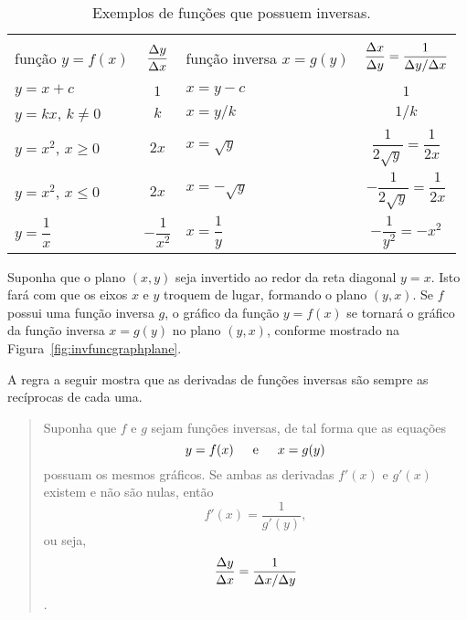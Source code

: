 \begin{table}
\caption{Exemplos de funções que possuem inversas.}
\def\SPC{\hspace{1em}}
\def\ISPC{\hspace{-1em}}
\label{tab:noinvfuncexamples}
\begin{tabular}{@{\SPC}l@{\SPC}|@{\SPC}c@{\SPC}|@{\SPC}l@{\SPC}|@{\SPC}c@{\SPC}}
 \hline
 & & & \\[-1em]
 \multirow{2}{*}{função $y = f(x)$} &
   \multirow{2}{*}{$\dfrac{\Delta{y}}{\Delta{x}}$} &
   \multirow{2}{*}{função inversa $x=g(y)$} &
   \multirow{2}{*}{$\dfrac{\Delta{x}}{\Delta{y}} = \dfrac{1}{\Delta{y}/\Delta{x}}$} \\
 & & & \\
 \hline
 & & & \\
 $y = x + c$               & $1$   & $x = y - c$     & $1$ \\[1.5em]
 $y = kx$, \; $k \ne 0$    & $k$   & $x = y/k$       & $1/k$ \\[1.5em]
 $y = x^2$, \; $x \ge 0$   & $2x$  & $x = \sqrt{y}$  & $\dfrac{1}{2\sqrt{y}} =
                                                        \dfrac{1}{2x}$ \\[1.5em]
 $y = x^2$, \; $x \le 0$   & $2x$  & $x = -\sqrt{y}$ & $-\dfrac{1}{2\sqrt{y}} =
                                                        \dfrac{1}{2x}$ \\[1.5em]
 $y = \dfrac{1}{x}$ & $-\dfrac{1}{x^2}$ & $x = \dfrac{1}{y}$ &
                                          $-\dfrac{1}{y^2} = -x^2$\\[1.5em]
 \hline
\end{tabular}
\end{table}

Suponha que o plano $(x, y)$ seja invertido ao redor da reta diagonal
$y = x$. Isto fará com que os eixos $x$ e $y$ troquem de lugar, formando
o plano $(y, x)$. Se $f$ possui uma função inversa $g$, o gráfico da
função $y = f(x)$ se tornará o gráfico da função inversa $x = g(y)$ no
plano $(y, x)$, conforme mostrado na Figura~\ref{fig:invfuncgraphplane}.


A regra a seguir mostra que as derivadas de funções inversas são sempre
as recíprocas de cada uma.


\begin{quote}
Suponha que $f$ e $g$ sejam funções inversas, de tal forma que as
equações
$$
  y = f(x) \hspace{1.5em} \text{e} \hspace{1.5em} x = g(y)
$$
possuam os mesmos gráficos. Se ambas as derivadas $f'(x)$ e
$g'(x)$ existem e não são nulas, então
$$
  f'(x) = \frac{1}{g'(y)},
$$
ou seja,
$$
  \frac{\Delta{y}}{\Delta{x}} = \frac{1}{\Delta{x}/\Delta{y}}
$$.
\end{quote}

